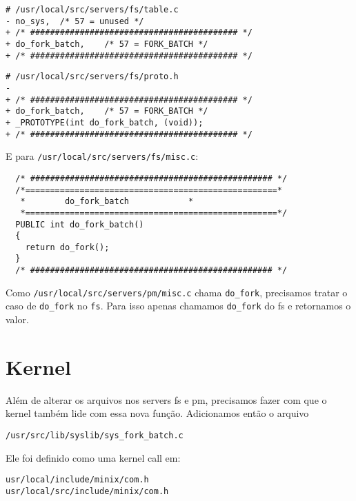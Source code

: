 \documentclass{amsart}
\theoremstyle{plain}
\newcommand{\code}[1]{\lstinline[mathescape=true]{#1}}
\begin{document}
\begin{lstlisting}[frame=leftline,mathescape=true,style=nonumbers]
# /usr/local/src/servers/fs/table.c
- no_sys,  /* 57 = unused */
+ /* ########################################## */
+ do_fork_batch,    /* 57 = FORK_BATCH */
+ /* ########################################## */
\end{lstlisting}

\begin{lstlisting}[frame=leftline,mathescape=true,style=nonumbers]
# /usr/local/src/servers/fs/proto.h
-
+ /* ########################################## */
+ do_fork_batch,    /* 57 = FORK_BATCH */
+ _PROTOTYPE(int do_fork_batch, (void));
+ /* ########################################## */
\end{lstlisting}

E para \code{/usr/local/src/servers/fs/misc.c}:

\begin{verbatim}
  /* ################################################# */
  /*===================================================*
   *        do_fork_batch            *
   *===================================================*/
  PUBLIC int do_fork_batch()
  {
    return do_fork();
  }
  /* ################################################# */
\end{verbatim}

Como \code{/usr/local/src/servers/pm/misc.c} chama \code{do_fork}, precisamos tratar o caso de
\code{do_fork} no \code{fs}. Para isso apenas chamamos \code{do_fork} do fs e retornamos o valor.

\section{Kernel}

Além de alterar os arquivos nos servers fs e pm, precisamos fazer com que o kernel também lide com essa nova função. Adicionamos então o arquivo


\begin{lstlisting}[frame=leftline,mathescape=true,style=nonumbers]
/usr/src/lib/syslib/sys_fork_batch.c
\end{lstlisting}

Ele foi definido como uma kernel call em:

\begin{lstlisting}[frame=leftline,mathescape=true,style=nonumbers]
usr/local/include/minix/com.h
usr/local/src/include/minix/com.h
\end{lstlisting}
\end{document}
